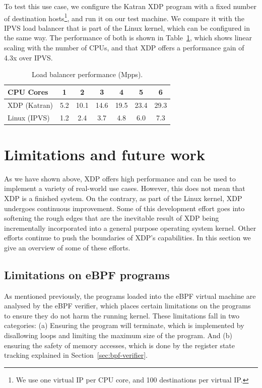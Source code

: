 \documentclass[sigconf]{acmart}
\begin{document}
To test this use case, we configure the Katran XDP program with a fixed number
of destination hosts\footnote{We use one virtual IP per CPU core, and 100
  destinations per virtual IP.}, and run it on our test machine. We compare it
with the IPVS load balancer that is part of the Linux kernel, which can be
configured in the same way. The performance of both is shown in
Table~\ref{tbl:load-balancer}, which shows linear scaling with the number of
CPUs, and that XDP offers a performance gain of 4.3x over IPVS.

\begin{table}[tbp]
\caption{\label{tbl:load-balancer}Load balancer performance (Mpps).}
\centering
\begin{tabular}{lcccccc}
  \toprule
  CPU Cores & 1   &  2  &  3  &  4  &  5  &  6  \\
  \midrule
  XDP (Katran) & 5.2 & 10.1 & 14.6 & 19.5 & 23.4 & 29.3 \\
  Linux (IPVS) & 1.2 & 2.4 & 3.7 & 4.8 & 6.0 & 7.3 \\
\bottomrule
\end{tabular}
\end{table}


\section{Limitations and future work}
\label{sec:limitations}
As we have shown above, XDP offers high performance and can be used to implement
a variety of real-world use cases. However, this does not mean that XDP is a
finished system. On the contrary, as part of the Linux kernel, XDP undergoes
continuous improvement. Some of this development effort goes into softening the
rough edges that are the inevitable result of XDP being incrementally
incorporated into a general purpose operating system kernel. Other efforts
continue to push the boundaries of XDP's capabilities. In this section we give
an overview of some of these efforts.

\subsection{Limitations on eBPF programs}
\label{sec:limit-ebpf-progr}

As mentioned previously, the programs loaded into the eBPF virtual machine are
analysed by the eBPF verifier, which places certain limitations on the programs
to ensure they do not harm the running kernel. These limitations fall in two
categories: (a) Ensuring the program will terminate, which is implemented by
disallowing loops and limiting the maximum size of the program. And (b) ensuring
the safety of memory accesses, which is done by the register state tracking
explained in Section~\ref{sec:bpf-verifier}.
\end{document}
